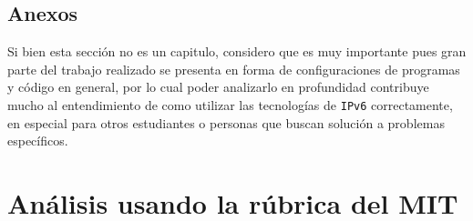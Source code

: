 \documentclass[spanish, fleqn]{article}
\begin{document}
    \subsection{Anexos}
    Si bien esta sección no es un capitulo, considero que es muy importante pues
    gran parte del trabajo realizado se presenta en forma de configuraciones de
    programas y código en general, por lo cual poder analizarlo en profundidad
    contribuye mucho al entendimiento de como utilizar las tecnologías de
    \texttt{IPv6} correctamente, en especial para otros estudiantes o personas
    que buscan solución a problemas específicos.

\newpage 
\section{Análisis usando la rúbrica del MIT}
\end{document}
